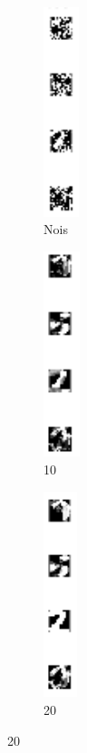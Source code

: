 \documentclass[a4paper, 10pt]{article}
\begin{document}
  \begin{figure}[h]
    \centering
    \begin{subfigure}[c]{0.07\linewidth}
      \includegraphics[width=\linewidth,height=6.1cm]{lab2/digits/noisy.png}
      \caption{Nois}
    \end{subfigure}
    \hfill
    \begin{subfigure}[c]{0.07\linewidth}
      \includegraphics[width=\linewidth,height=6cm]{lab2/digits/col_n10i10.png}
      \caption{10}
    \end{subfigure}
    \hfill
    \begin{subfigure}[c]{0.07\linewidth}
      \includegraphics[width=\linewidth,height=6cm]{lab2/digits/col_n10i20.png}
      \caption{20}
    \end{subfigure}
    \hfill

\end{figure}
\end{document}
